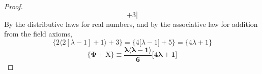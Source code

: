 \documentclass[preview]{standalone}
\begin{document}
\begin{proof}
\begin{equation*}
                +
            3
        \Bigg]
    \end{equation*}
    By the distributive laws for real numbers, 
    and by the associative law for addition from the field axioms,
    \begin{equation*}
        \bigg \{
            2 \Big \langle 2 [ \lambda - 1 ] + 1 \Big \rangle + 3
        \bigg \}
            =
        \bigg \{
            4 [ \lambda - 1 \big ] + 5
        \bigg \}
            =
        \bigg \{
            4 \lambda + 1
        \bigg \}
    \end{equation*}
    \bm{$\therefore$}
    \begin{equation*}
        \bm{
            \Bigg \{
                \Phi
                    +
                \mathrm{X}
            \Bigg \}
                \equiv
            \frac{
                \lambda
                \big \langle \lambda - 1 \big \rangle
            }
            {6}
            \Bigg[
                4 \lambda + 1
            \Bigg]
        }
    \end{equation*}
\end{proof}
\end{document}
